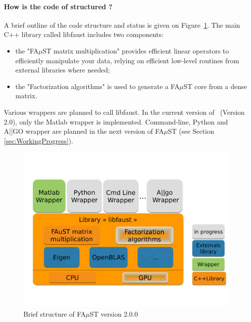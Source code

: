 \paragraph{How is the code of \FAuST structured ?}
A brief outline of the code structure and status is given on Figure~\ref{fig:faustStructure}. The main C++ library called \textrm{libfaust} includes two components:
\begin{itemize}
\item the "FA$\mu$ST matrix multiplication" provides efficient linear operators to efficiently manipulate your data, relying on efficient low-level routines from external libraries where needed; 
\item the "Factorization algorithms" is used to generate a FA$\mu$ST core from a dense matrix. 
\end{itemize}
Various wrappers are planned to call \textrm{libfaust}. In the current version of \FAuST\ (Version 2.0), only the Matlab wrapper is implemented. Command-line, Python and A||GO wrapper are planned in the next version of FA$\mu$ST (see Section \ref{sec:WorkingProgress}).   


\begin{figure}[H] %
\centering
\includegraphics[scale=0.45,trim = 0cm 3cm 0cm 3cm, clip]{images/FaustStructure.pdf}
\caption{Brief structure of FA$\mu$ST version 2.0.0}
\label{fig:faustStructure}
\end{figure}

